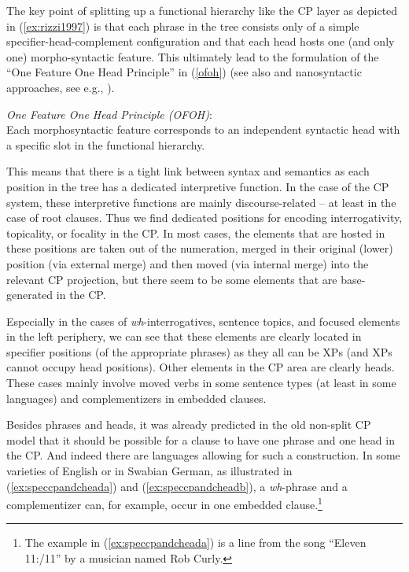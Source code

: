 \noindent The key point of splitting up a functional hierarchy like the CP layer as depicted in (\ref{ex:rizzi1997}) is that each phrase in the tree consists only of a simple specifier-head-complement configuration and that each head hosts one (and only one) morpho-syntactic feature. This ultimately lead to the formulation of the ``One Feature One Head Principle'' \citep[45]{cinque2008cartography} in (\ref{ofoh}) (see also \citealt{kayne2005some} and nanosyntactic approaches, see e.g., \citealt{starke2009nanosyntax}).

\begin{exe}
\ex \textit{One Feature One Head Principle (OFOH)}:  \\
Each morphosyntactic feature corresponds to an independent syntactic head with a specific slot in the functional hierarchy.\label{ofoh}
\end{exe}

\noindent This means that there is a tight link between syntax and semantics as each position in the tree has a dedicated interpretive function. In the case of the CP system, these interpretive functions are mainly discourse-related -- at least in the case of root clauses. Thus we find dedicated positions for encoding interrogativity, topicality, or focality in the CP. In most cases, the elements that are hosted in these positions are taken out of the numeration, merged in their original (lower) position (via external merge) and then moved (via internal merge) into the relevant CP projection, but there seem to be some elements that are base-generated in the CP. 

Especially in the cases of \textit{wh}-interrogatives, sentence topics, and focused elements in the left periphery, we can see that these elements are clearly located in specifier positions (of the appropriate phrases) as they all can be XPs (and XPs cannot occupy head positions). Other elements in the CP area are clearly heads. These cases mainly involve moved verbs in some sentence types (at least in some languages) and complementizers in embedded clauses.

Besides phrases and heads, it was already predicted in the old non-split CP model that it should be possible for a clause to have one phrase and one head in the CP. And indeed there are languages allowing for such a construction. In some varieties of English or in Swabian German, as illustrated in (\ref{ex:speccpandcheada}) and (\ref{ex:speccpandcheadb}), a \textit{wh}-phrase and a complementizer can, for example, occur in one embedded clause.\footnote{ The example in (\ref{ex:speccpandcheada}) is a line from the song ``Eleven 11:/11'' by a musician named Rob Curly.}


